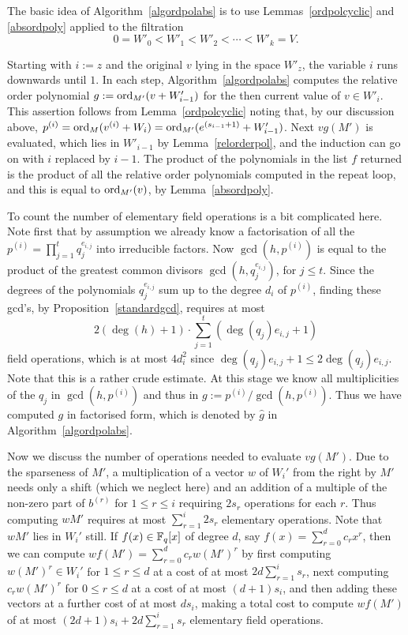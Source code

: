 The basic idea of Algorithm~\ref{algordpolabs} is to use
Lemmas~\ref{ordpolcyclic} and \ref{absordpoly} applied to the filtration
\[ 0 = W'_0 < W'_1 < W'_2 < \cdots < W'_k = V. \]

Starting with $i := z$ and the original $v$ lying in the space 
$W'_z$, the variable $i$ runs downwards until $1$.
In each step, Algorithm~\ref{algordpolabs}
computes the relative order polynomial $g := \mathrm{ord}_{M'}(v+W'_{i-1})$
for the then current value of $v \in W'_i$.
This assertion follows from
Lemma~\ref{ordpolcyclic} noting that,
by our discussion above, $p^{(i)} = \mathrm{ord}_M(v^{(i)}+W_i)= \mathrm{ord}_{M'}(e^{(s_{i-1}+1)}+W'_{i-1})$.
Next $v g(M')$ is evaluated, which lies in $W'_{i-1}$ by
Lemma~\ref{relorderpol}, and the induction can go on with $i$
replaced by $i-1$. The product of the polynomials in the list $f$ 
returned is the product of all 
the relative order polynomials computed in the repeat loop, and this is equal to
$\mathrm{ord}_{M'}(v)$, by Lemma~\ref{absordpoly}.

To count the number of elementary field operations is a bit complicated
here. Note first that by assumption we already know a factorisation of all the
$p^{(i)} = \prod_{j=1}^t q_j^{e_{i,j}}$ into
irreducible factors. Now  $\gcd(h,p^{(i)})$ is equal to the product of
the greatest common divisors $\gcd(h,q_j^{e_{i,j}})$, for $j\leq t$. Since the degrees of the
polynomials  $q_j^{e_{i,j}}$ sum up to the degree $d_i$ of $p^{(i)}$, finding these gcd's, by 
Proposition~\ref{standardgcd}, requires at most
\[ 
2(\deg(h)+1) \cdot \sum_{j=1}^t \left(\deg(q_j) e_{i,j} + 1\right) 
\] 
field operations, which is at most $4d_i^2$ since
$\deg(q_j) e_{i,j} + 1 \le 2 \deg(q_j) e_{i,j}$. Note that this is a rather
crude estimate. At this stage we know all multiplicities of the
$q_j$ in $\gcd(h,p^{(i)})$ and thus in $g := p^{(i)}/\gcd(h,p^{(i)})$.
Thus we have computed $g$ in factorised form, which is denoted by
$\hat g$ in Algorithm~\ref{algordpolabs}.

Now we discuss the number of operations needed to evaluate $v g(M')$.
Due to the sparseness of $M'$, a multiplication of a vector $w$ of
$W_i'$ from the right by $M'$ needs only a shift (which we neglect here)
and an addition of a multiple of the non-zero
part of $b^{(r)}$ for $1 \le r \le i$ requiring $2s_r$ operations for
each $r$. Thus computing $wM'$ requires at most $\sum_{r=1}^i 2s_r $
elementary operations. Note that $wM'$ lies in $W_i'$ still. If
$f(x)\in\mathbb{F}_q[x]$ of degree $d$, say $f(x)=\sum_{r=0}^dc_rx^r$, then we
can compute $wf(M')=\sum_{r=0}^dc_rw(M')^r$ by first computing
$w(M')^r\in W_i'$ for $1\leq r\leq d$ at a cost of at most
$2d\sum_{r=1}^i s_r $, next computing $c_rw(M')^r$ for $0\leq r\leq d$
at a cost of at most $(d+1)s_i$, and then adding these vectors at a
further cost of at most
$ds_i$, making a total cost to compute $wf(M')$ of at most
$(2d+1)s_i +2d\sum_{r=1}^i s_r $ elementary field operations.

